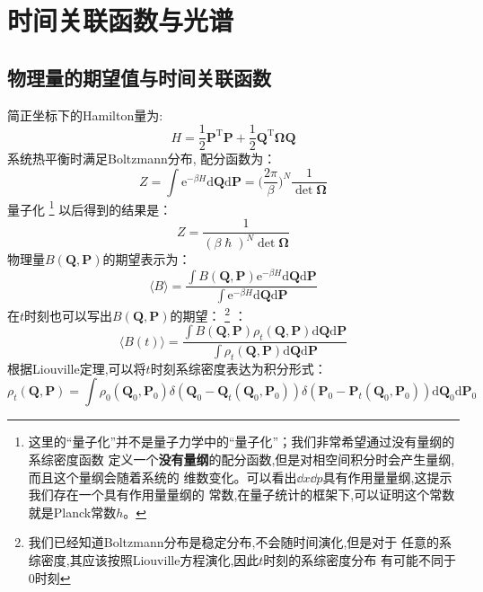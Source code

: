 \chapter{时间关联函数与光谱}
    \section{物理量的期望值与时间关联函数}

    简正坐标下的Hamilton量为:
    \begin{equation}
        H = \frac 12 \bm{P}^\mathrm{T}\bm{P} + \frac 12 \bm{Q}^\mathrm{T} \bm{\Omega Q}
    \end{equation}
    系统热平衡时满足Boltzmann分布, 配分函数为：
    \begin{equation}
        Z = \int \mathrm{e}^{-\beta H} \mathrm{d}\bm{Q}\mathrm{d}\bm{P} = \bigg(\frac {2\pi}{\beta}\bigg)^N \frac 1{\det \bm{\Omega}}
    \end{equation}
    量子化
    \footnote{
        这里的“量子化”并不是量子力学中的“量子化”；我们非常希望通过没有量纲的系综密度函数
        定义一个\textbf{没有量纲}的配分函数,但是对相空间积分时会产生量纲,而且这个量纲会随着系统的
        维数变化。可以看出$\dd x\dd p$具有作用量量纲,这提示我们存在一个具有作用量量纲的
        常数,在量子统计的框架下,可以证明这个常数就是Planck常数$h$。
    }
    以后得到的结果是：
    \begin{equation}
        Z = \frac 1{(\beta \hslash)^N \det \bm{\Omega}}
    \end{equation}
    物理量$B(\bm{Q}, \bm{P})$的期望表示为：
    \begin{equation}
        \langle B \rangle = \frac {\int B(\bm{Q,P})\mathrm{e}^{-\beta H} \mathrm{d}\bm{Q}\mathrm{d}\bm{P}}{\int \mathrm{e}^{-\beta H} \mathrm{d}\bm{Q}\mathrm{d}\bm{P}}
    \end{equation}
    在$t$时刻也可以写出$B(\bm{Q}, \bm{P})$的期望：
    \footnote{我们已经知道Boltzmann分布是稳定分布,不会随时间演化,但是对于
    任意的系综密度,其应该按照Liouville方程演化,因此$t$时刻的系综密度分布
    有可能不同于0时刻}
    ：
    \begin{equation}
        \langle B(t) \rangle = \frac {\int B(\bm{Q,P}) \rho_t(\bm{Q,P}) \mathrm{d}\bm{Q}\mathrm{d}\bm{P}}{\int \rho_t(\bm{Q,P}) \mathrm{d}\bm{Q}\mathrm{d}\bm{P}}
    \end{equation}
    根据Liouville定理,可以将$t$时刻系综密度表达为积分形式：
    \begin{equation}
        \rho_t (\bm{Q,P}) = \int \rho_0(\bm{Q}_0, \bm{P}_0)\delta(\bm{Q}_0-\bm{Q}_t(\bm{Q}_0, \bm{P}_0)) \delta(\bm{P}_0-\bm{P}_t(\bm{Q}_0, \bm{P}_0)) \mathrm{d}\bm{Q}_0\mathrm{d}\bm{P}_0
    \end{equation}
